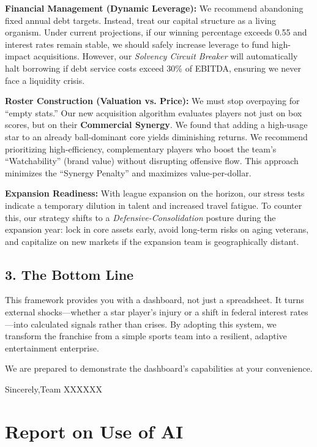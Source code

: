 \documentclass{mcmthesis}
\begin{document}
\textbf{Financial Management (Dynamic Leverage):}
We recommend abandoning fixed annual debt targets. Instead, treat our capital structure as a living organism. Under current projections, if our winning percentage exceeds 0.55 and interest rates remain stable, we should safely increase leverage to fund high-impact acquisitions. However, our \textit{Solvency Circuit Breaker} will automatically halt borrowing if debt service costs exceed 30\% of EBITDA, ensuring we never face a liquidity crisis.

\textbf{Roster Construction (Valuation vs. Price):}
We must stop overpaying for ``empty stats.'' Our new acquisition algorithm evaluates players not just on box scores, but on their \textbf{Commercial Synergy}. We found that adding a high-usage star to an already ball-dominant core yields diminishing returns. We recommend prioritizing high-efficiency, complementary players who boost the team's ``Watchability'' (brand value) without disrupting offensive flow. This approach minimizes the ``Synergy Penalty'' and maximizes value-per-dollar.

\textbf{Expansion Readiness:}
With league expansion on the horizon, our stress tests indicate a temporary dilution in talent and increased travel fatigue. To counter this, our strategy shifts to a \textit{Defensive-Consolidation} posture during the expansion year: lock in core assets early, avoid long-term risks on aging veterans, and capitalize on new markets if the expansion team is geographically distant.

\subsection*{3. The Bottom Line}
This framework provides you with a dashboard, not just a spreadsheet. It turns external shocks—whether a star player's injury or a shift in federal interest rates—into calculated signals rather than crises. By adopting this system, we transform the franchise from a simple sports team into a resilient, adaptive entertainment enterprise.

We are prepared to demonstrate the dashboard's capabilities at your convenience.

\vspace{1cm}

Sincerely,Team XXXXXX

\vspace{0.5cm}


\section*{Report on Use of AI}
\end{document}
